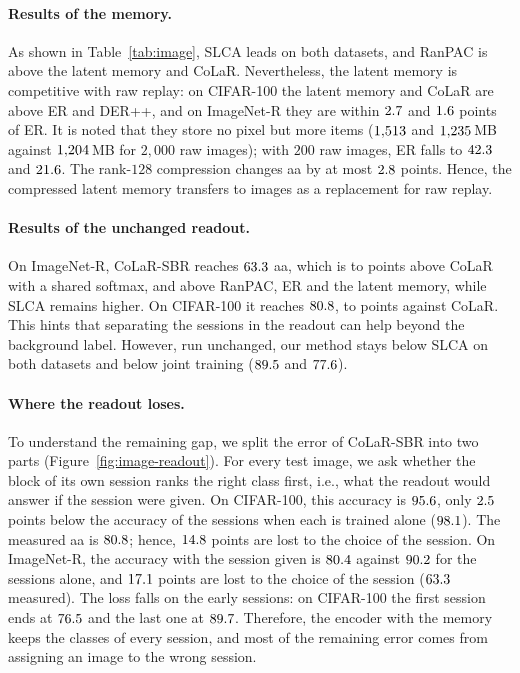 \paragraph{Results of the memory.} As shown in Table~\ref{tab:image}, SLCA leads on both
datasets, and RanPAC is above the latent memory and CoLaR. Nevertheless, the latent memory
is competitive with raw replay: on CIFAR-100 the latent memory and CoLaR are above ER and
DER++, and on ImageNet-R they are within $2.7$ and $1.6$
points of ER. It is noted that they store no pixel but more items ($1{,}513$ and
$1{,}235$\,MB against $1{,}204$\,MB for $2{,}000$ raw images); with $200$ raw
images, ER falls to $42.3$ and $21.6$. The rank-$128$ compression
changes \gls{aa} by at most $2.8$ points. Hence, the compressed latent
memory transfers to images as a replacement for raw replay.

\paragraph{Results of the unchanged readout.} On ImageNet-R, CoLaR-SBR reaches $63.3$ \gls{aa},
which is \imgSbrMinusColarImnrMin{} to \imgSbrMinusColarImnrMax{} points above CoLaR with a
shared softmax, and above RanPAC, ER and the latent memory, while SLCA remains higher. On
CIFAR-100 it reaches $80.8$, \imgSbrMinusColarCifarMin{} to
\imgSbrMinusColarCifarMax{} points against CoLaR. This hints that separating the sessions in
the readout can help beyond the background label. However, run unchanged, our method stays
below SLCA on both datasets and below joint training ($89.5$ and $77.6$).

\paragraph{Where the readout loses.} To understand the remaining gap, we split the error
of CoLaR-SBR into two parts (Figure~\ref{fig:image-readout}). For every test image, we ask
whether the block of its own session ranks the right class first, i.e., what the readout
would answer if the session were given. On CIFAR-100, this accuracy is $95.6$,
only $2.5$ points below the accuracy of the sessions when each is trained
alone ($98.1$). The measured \gls{aa} is $80.8$; hence,
$14.8$ points are lost to the choice of the session. On ImageNet-R, the
accuracy with the session given is $80.4$ against $90.2$ for the sessions
alone, and $17.1$ points are lost to the choice of the session
($63.3$ measured). The loss falls on the early sessions: on CIFAR-100 the first
session ends at $76.5$ and the last one at $89.7$.
Therefore, the encoder with the memory keeps the classes of every session, and most of the
remaining error comes from assigning an image to the wrong session.

